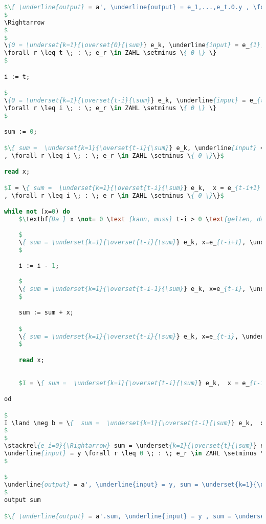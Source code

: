 \documentclass[11pt,a4paper,ngerman]{article}
\begin{document}
\begin{lstlisting}[language=Pascal]
$\{ \underline{output} = a', \underline{output} = e_1,...,e_t.0.y , \forall i \leq t \; : \; e_i \in ZAHL \setminus \{ 0 \}\} $
$
\Rightarrow
$
$
\{0 = \underset{k=1}{\overset{0}{\sum}} e_k, \underline{input} = e_{1},...,e_t.0.y, 0 \geq 0,
\forall r \leq t \; : \; e_r \in ZAHL \setminus \{ 0 \} \}
$

i := t;

$
\{0 = \underset{k=1}{\overset{t-i}{\sum}} e_k, \underline{input} = e_{t-i+1},...,e_{t}.0.y, t-i \geq 0,
\forall r \leq i \; : \; e_r \in ZAHL \setminus \{ 0 \} \}
$

sum := 0;

$\{ sum =  \underset{k=1}{\overset{t-i}{\sum}} e_k, \underline{input} = e_{t-i+1},..,e_{t}.0.y , t-i \geq 0
, \forall r \leq i \; : \; e_r \in ZAHL \setminus \{ 0 \}\}$

read x;

$I = \{ sum =  \underset{k=1}{\overset{t-i}{\sum}} e_k,  x = e_{t-i+1} , \underline{input} = e_{t-i+2},..,e_{t}.0.y , t-i \geq 0
, \forall r \leq i \; : \; e_r \in ZAHL \setminus \{ 0 \}\}$

while not (x=0) do
    $\textbf{Da } x \not= 0 \text {kann, muss} t-i > 0 \text{gelten, daher gilt die Nachstehende Bedingung.}$     
   
    $ 
    \{ sum = \underset{k=1}{\overset{t-i}{\sum}} e_k, x=e_{t-i+1}, \underline{input} = e_{t-i+2},...,e_{t}.0.y, t - i > 0, \forall r \leq i \; : \; ZAHL \setminus \{ 0 \} \}
    $

    i := i - 1;    
 
    $
    \{ sum = \underset{k=1}{\overset{t-i-1}{\sum}} e_k, x=e_{t-i}, \underline{input} = e_{t-i+1},...,e_{t}.0.y, t - i \geq 0, \forall r \leq i \; : \; ZAHL \setminus \{ 0 \} \}
    $

    sum := sum + x;

    $
    \{ sum = \underset{k=1}{\overset{t-i}{\sum}} e_k, x=e_{t-i}, \underline{input} = e_{t-i+1},...,e_{t}.0.y, t-i\geq 0, \forall r \leq i-1 \; : \; ZAHL \setminus \{ 0 \} \}
    $

    read x;
    
    
    $I = \{ sum =  \underset{k=1}{\overset{t-i}{\sum}} e_k,  x = e_{t-i+1} , \underline{input} = e_{t-i+2},..,e_{t}.0.y , t-i \geq 0,  \forall r \leq i \; : \; e_r \in ZAHL \setminus \{ 0 \}\}$

od

$
I \land \neg b = \{  sum =  \underset{k=1}{\overset{t-i}{\sum}} e_k,  x = e_{t-i+1}, \underline{input} = e_{t-i+2},..,e_{t}.0.y , i = 0, \forall r \leq i \; : \; e_r \in ZAHL \setminus \{ 0 \} , x = 0\}
$
$
\stackrel{e_i=0}{\Rightarrow} sum = \underset{k=1}{\overset{t}{\sum}} e_k , x = e_{i-1} = 0, 
\underline{input} = y \forall r \leq 0 \; : \; e_r \in ZAHL \setminus \{ 0 \}, i = 0\}
$

$
\underline{output} = a', \underline{input} = y, sum = \underset{k=1}{\overset{t}{\sum}} e_k \}
$
output sum

$\{ \underline{output} = a'.sum, \underline{input} = y , sum = \underset{k=1}{\overset{t}{\sum}} e_k \}$
\end{lstlisting}
\end{document}
